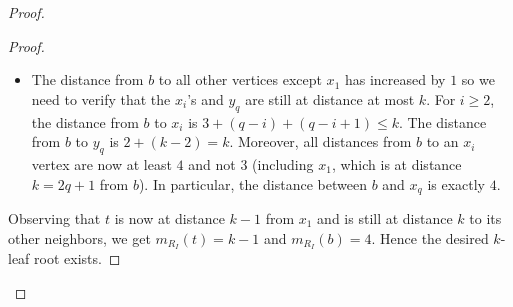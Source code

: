 \documentclass[11pt,letter]{article}
\theoremstyle{remark}
\begin{document}
\begin{proof}
\begin{proof}
\begin{itemize}
            \item The distance from $b$ to all other vertices except $x_1$ has increased by $1$ so we need to verify that the $x_i$'s and $y_q$ are still at distance at most $k$. For $i\geq 2$, the distance from $b$ to $x_i$ is $3+(q-i)+(q-i+1)\leq k$. The distance from $b$ to $y_q$ is $2+(k-2)=k$. Moreover, all distances from $b$ to an $x_i$ vertex are now at least $4$ and not $3$ (including $x_1$, which is at distance $k=2q+1$ from $b$). In particular, the distance between $b$ and $x_q$ is exactly $4$.
        \end{itemize}
      Observing that $t$ is now at distance $k - 1$ from $x_1$ and is still at distance $k$ to its other neighbors, we get $m_{R_I}(t) = k - 1$ and $m_{R_I}(b) = 4$.  Hence the desired $k$-leaf root exists.
    \end{proof}
    

\end{proof}
\end{document}
